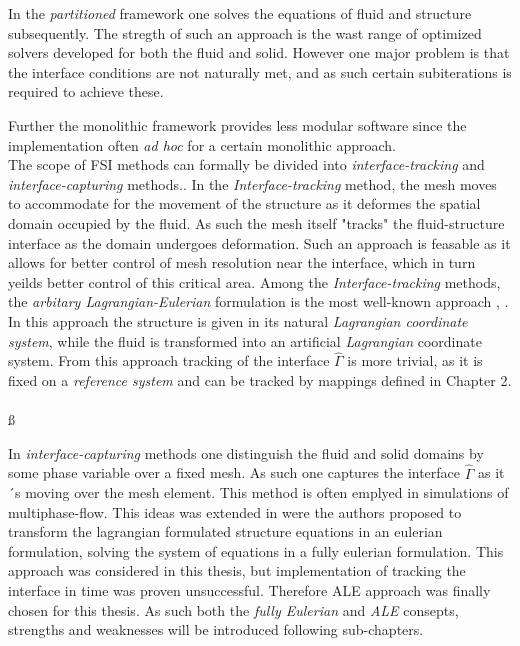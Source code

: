 In the \textit{partitioned} framework one solves the equations of fluid and structure subsequently. The stregth of such an approach is the wast range of optimized solvers developed for both the fluid and solid. However one major problem is that the interface conditions are not naturally met, and as such certain subiterations is required to achieve these. 

 Further the monolithic framework provides less modular software since the implementation often \textit{ad hoc} for a certain monolithic approach.  
\\

The scope of FSI methods can formally be divided into \textit{interface-tracking} and \textit{interface-capturing } methods.\cite{Frei2016}. In the \textit{Interface-tracking} method, the mesh moves to accommodate for the movement of the structure as it deformes the spatial domain occupied by the fluid. As such the mesh itself "tracks" the fluid-structure interface as the domain undergoes deformation. Such an approach is feasable as it allows for better control of mesh resolution near the interface, which in turn yeilds better control of this critical area. Among the  \textit{Interface-tracking} methods, the \textit{arbitary Lagrangian-Eulerian} formulation is the most well-known approach \cite{Richter2010a}, \cite{Frei2016}. In this approach the structure is given in its natural \textit{Lagrangian coordinate system}, while the fluid is transformed into an artificial \textit{Lagrangian} coordinate system. From this approach tracking of the interface $\hat{\Gamma}$ is more trivial, as it is fixed on a \textit{reference system} and can be tracked by mappings defined in Chapter 2. \\ \\ß

In \textit{interface-capturing} methods one distinguish the fluid and solid domains by some phase variable over a fixed mesh. As such one captures the interface  $\hat{\Gamma}$ as it´s moving over the mesh element. This method is often emplyed in simulations of multiphase-flow. This ideas was extended in \cite{Dunne2006a} were the authors proposed to transform the lagrangian formulated structure equations in an eulerian formulation, solving the system of equations in a fully eulerian formulation. 
This approach was considered in this thesis, but implementation of tracking the interface in time was proven unsuccessful. Therefore ALE approach was finally chosen for this thesis. As such both the \textit{fully Eulerian} and \textit{ALE} consepts, strengths and weaknesses will be introduced following sub-chapters. \\

